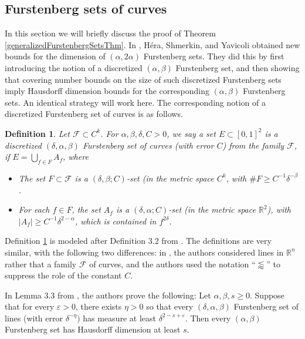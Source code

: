 \documentclass[letterpaper, reqno,11pt]{article}
\numberwithin{equation}{section}
\newcommand{\RR}{\mathbb{R}}
\newcommand{\eps}{\varepsilon}
\numberwithin{thm}{section}
\newtheorem{defn}[thm]{Definition}
\theoremstyle{remark}
\begin{document}
\subsection{Furstenberg sets of curves}
In this section we will briefly discuss the proof of Theorem \ref{generalizedFurstenbergSetsThm}. In \cite{HSY}, H\'era, Shmerkin, and Yavicoli obtained new bounds for the dimension of $(\alpha, 2\alpha)$ Furstenberg sets. They did this by first introducing the notion of a discretized $(\alpha,\beta)$ Furstenberg set, and then showing that covering number bounds on the size of such discretized Furstenberg sets imply Hausdorff dimension bounds for the corresponding $(\alpha,\beta)$ Furstenberg sets. An identical strategy will work here. The corresponding notion of a discretized Furstenberg set of curves is as follows. 

\begin{defn}\label{discretizedFurstenbergSetOfCurves}
Let $\mathcal{F}\subset C^k$. For $\alpha,\beta,\delta, C>0$, we say a set $E\subset[0,1]^2$ is a discretized $(\delta, \alpha, \beta)$ Furstenberg set of curves (with error $C$) from the family $\mathcal{F}$, if $E=\bigcup_{f\in F}A_f$, where
\begin{itemize}
    \item The set $F\subset \mathcal{F}$ is a $(\delta, \beta; C)$-set (in the metric space $C^k$, with $\#F \geq C^{-1}\delta^{-\beta}$.
    \item For each $f\in F$, the set $A_f$ is a $(\delta,\alpha;C)$-set (in the metric space $\RR^2$), with $|A_f|\geq C^{-1}\delta^{2-\alpha}$, which is contained in $f^{2\delta}$.
\end{itemize}
\end{defn}

Definition \ref{discretizedFurstenbergSetOfCurves} is modeled after Definition 3.2 from \cite{HSY}. The definitions are very similar, with the following two differences: in \cite{HSY}, the authors considered lines in $\RR^n$ rather that a family $\mathcal{F}$ of curves, and the authors used the notation ``$\lessapprox$'' to suppress the role of the constant $C$. 

In Lemma 3.3 from \cite{HSY}, the authors prove the following: Let $\alpha,\beta,s\geq 0$. Suppose that for every $\eps>0$, there exists $\eta>0$ so that every $(\delta, \alpha,\beta)$ Furstenberg set of lines (with error $\delta^{-\eta})$ has measure at least $\delta^{2-s+\eps}$. Then every $(\alpha,\beta)$ Furstenberg set has Hausdorff dimension at least $s$. 
\end{document}
